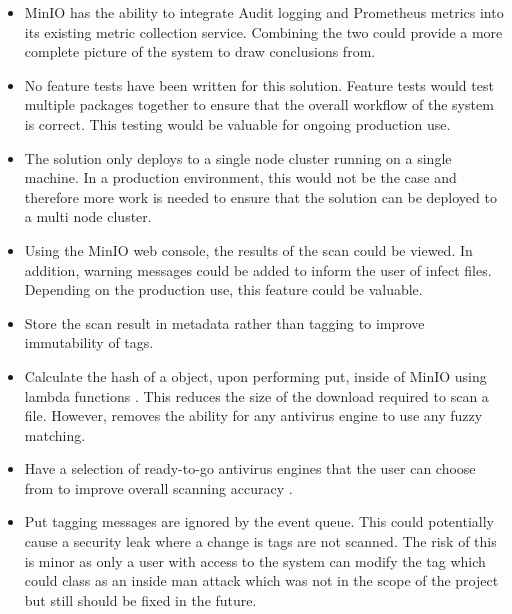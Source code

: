 \documentclass[12pt, conference, final, a4paper, onecolumn, compsoc]{IEEEtran}
\begin{document}
\begin{itemize}
  \item MinIO has the ability to integrate Audit logging and Prometheus metrics
        into its existing metric collection service. Combining the two could
        provide a more complete picture of the system to draw conclusions from.
  \item No feature tests have been written for this solution. Feature tests
        would test multiple packages together to ensure that the overall
        workflow of the system is correct. This testing would be valuable for
        ongoing production use.
  \item The solution only deploys to a single node cluster running on a single
        machine. In a production environment, this would not be the case and
        therefore more work is needed to ensure that the solution can be
        deployed to a multi node cluster.
  \item Using the MinIO web console, the results of the scan could be viewed. In
        addition, warning messages could be added to inform the user of infect
        files. Depending on the production use, this feature could be valuable.
  \item Store the scan result in metadata rather than tagging to improve
        immutability of tags.
  \item Calculate the hash of a object, upon performing put, inside of MinIO
        using lambda functions \citep{minio-lambda}. This reduces the size of
        the download required to scan a file. However, removes the ability for any
        antivirus engine to use any fuzzy matching.
  \item Have a selection of ready-to-go antivirus engines that the user can
        choose from to improve overall scanning accuracy \citep{av-comparison}.
  \item Put tagging messages are ignored by the event queue. This could
        potentially cause a security leak where a change is tags are not
        scanned. The risk of this is minor as only a user with access to the
        system can modify the tag which could class as an inside man attack
        which was not in the scope of the project but still should be fixed in
        the future.
\end{itemize}

\end{document}
